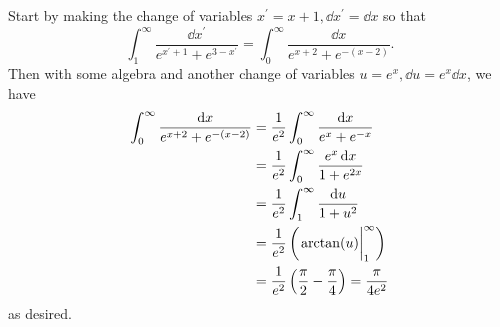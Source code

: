 \documentclass[11pt]{article}
\newcommand{\br}[1]{\left(#1\right)}
\begin{document}
Start by making the change of variables $x^{\prime} = x + 1, \dd{x^{\prime}} = \dd{x}$ so that \[\int_1^{\infty} \frac{\dd{x^{\prime}}}{e^{x^{\prime}+1} + e^{3-x^{\prime}}} = \int_0^{\infty}\frac{\dd{x}}{e^{x+2} + e^{-(x-2)}}.\] Then with some algebra and another change of variables $u = e^x, \dd{u} = e^x\dd{x}$, we have\begin{align*}
    \int_0^{\infty}\frac{\dd{x}}{e^{x+2} + e^{-(x-2)}} &= \frac{1}{e^2}\int_0^{\infty}\frac{\dd{x}}{e^{x} + e^{-x}}\\
    &= \frac{1}{e^2}\int_0^{\infty}\frac{e^x\dd{x}}{1 + e^{2x}}\\
    &= \frac{1}{e^2}\int_1^{\infty}\frac{\dd{u}}{1 + u^2}\\
    &= \frac{1}{e^2}\br{\eval{\arctan(u)}_1^{\infty}}\\
    &=\frac{1}{e^2}\br{\frac{\pi}{2}-\frac{\pi}{4}} = \frac{\pi}{4e^2}
\end{align*} as desired.
\end{document}
